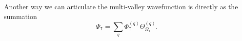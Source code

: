 












Another way we can articulate the multi-valley wavefunction is directly as the
summation 
\begin{equation}
\Psi_{\mathtt{I}}
    =
        \sum_{q}
            \Phi_{\mathtt{I}}^{\left(q\right)}
            \Theta_{ \Omega_\mathtt{I} }^{\left(q\right)}
.
\end{equation}


